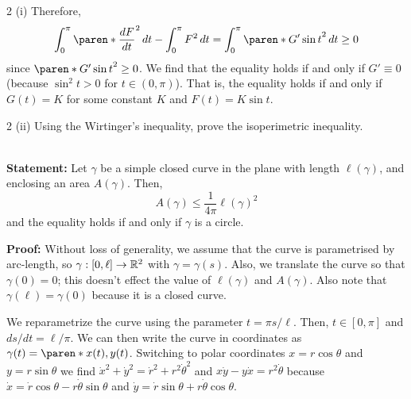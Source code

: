 \documentclass[11pt]{penrose}
\begin{document}
\begin{problem}{2 (i)}
    Therefore,
    \begin{equation*}
        \int_{0}^{\pi} \paren*{\frac{dF}{dt}}^2 \,dt
        - \int_{0}^{\pi} F^2 \,dt
        = \int_{0}^{\pi} \paren*{G' \sin t}^2 \,dt \geq 0
    \end{equation*}
    since $\paren*{G' \sin t}^2 \geq 0$. We find that the equality holds if and only if $G' \equiv 0$ (because $\sin^2 t > 0$ for $t \in (0, \pi)$). That is, the equality holds if and only if $G(t) = K$ for some constant $K$ and $F(t) = K \sin t$.
\end{problem}

\begin{problem}{2 (ii)}
    Using the Wirtinger's inequality, prove the isoperimetric inequality.

    \solution\\
    \textbf{Statement:} Let $\gamma$ be a simple closed curve in the plane with length $\ell(\gamma)$, and enclosing an area $A(\gamma)$. Then,
        \begin{equation*}
            A(\gamma) \leq \frac{1}{4\pi} \ell(\gamma)^2
        \end{equation*}
        and the equality holds if and only if $\gamma$ is a circle.
    
    \textbf{Proof:} Without loss of generality, we assume that the curve is parametrised by arc-length, so $\gamma : [0, \ell] \to \mathbb{R}^2$ with $\gamma = \gamma(s)$. Also, we translate the curve so that $\gamma(0) = 0$; this doesn't effect the value of $\ell(\gamma)$ and $A(\gamma)$. Also note that $\gamma(\ell) = \gamma(0)$ because it is a closed curve.

    We reparametrize the curve using the parameter $t = \pi s / \ell$. Then, $t \in [0, \pi]$ and $ds/dt = \ell/\pi$. We can then write the curve in coordinates as $\gamma(t) = \paren*{x(t), y(t)}$. Switching to polar coordinates $x = r \cos\theta$ and $y = r \sin\theta$ we find $\dot{x}^2 + \dot{y}^2 = \dot{r}^2 + r^2 \dot{\theta}^2$ and $x\dot{y} - y\dot{x} = r^2 \dot{\theta}$ because $\dot{x} = \dot{r} \cos\theta - r \dot{\theta} \sin\theta$ and $\dot{y} = \dot{r} \sin\theta + r \dot{\theta} \cos\theta$.


\end{problem}
\end{document}
